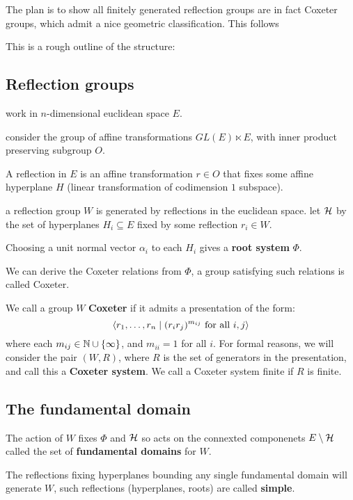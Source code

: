 \documentclass[../main.tex]{subfiles}
\begin{document}
The plan is to show all finitely generated reflection groups are in fact Coxeter groups, which admit a nice geometric classification. This follows\cite{Humphreys1990}

This is a rough outline of the structure:

\subsection{Reflection groups}

work in $n$-dimensional euclidean space $E$.

consider the group of affine transformations $GL(E)\ltimes E$, with inner product preserving subgroup $O$.

A reflection in $E$ is an affine transformation $r\in O$ that  fixes some affine hyperplane $H$ (linear transformation of codimension $1$ subspace).

a reflection group $W$ is generated by reflections in the euclidean space. let $\mathcal{H}$ by the set of hyperplanes $H_i\subseteq E$ fixed by some reflection $r_i\in W$. 

Choosing a unit normal vector $\alpha_i$ to each $H_i$ gives a \textbf{root system} $\Phi$. 

We can derive the Coxeter relations from $\Phi$, a group satisfying such relations is called Coxeter.

\begin{definition}
    We call a group $W$ \textbf{Coxeter} if it admits a presentation of the form:\[
    \left\langle r_1,\ldots,r_n \mid (r_ir_j)^{m_{ij}}\text{ for all }i,j \right\rangle
    \]
    where each $m_{ij}\in \mathbb{N}\cup\{\infty\}$, and $m_{ii}=1$ for all $i$. For formal reasons, we will consider the pair $(W,R)$, where $R$ is the set of generators in the presentation, and call this a \textbf{Coxeter system}. We call a Coxeter system finite if $R$ is finite.
\end{definition}

\subsection{The fundamental domain}

The action of $W$ fixes $\Phi$ and $\mathcal{H}$ so acts on the connexted componenets $E\setminus\mathcal{H}$ called the set of \textbf{fundamental domains} for $W$. 

The reflections fixing hyperplanes bounding any single fundamental domain will generate $W$, such reflections (hyperplanes, roots) are called \textbf{simple}.
\end{document}
